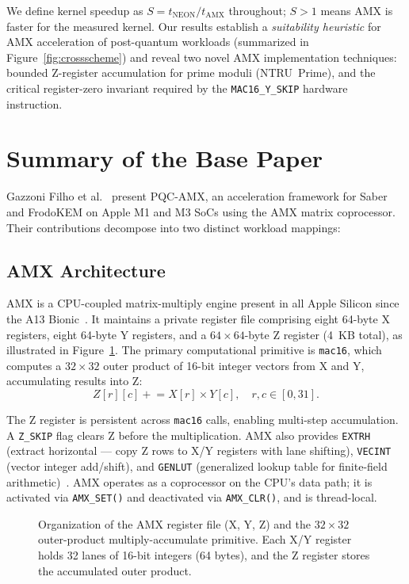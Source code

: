 \documentclass[utf8]{FrontiersinHarvard}
\newcommand{\boxedfigure}[1]{%
  \fcolorbox{BorderGray}{LightBg}{%
    \begin{minipage}{0.94\linewidth}
      \centering
      #1
    \end{minipage}}}
\begin{document}
We define kernel speedup as $S = t_{\text{NEON}} / t_{\text{AMX}}$ throughout; $S > 1$ means AMX is faster for the measured kernel. Our results establish a \emph{suitability heuristic} for AMX acceleration of post-quantum workloads (summarized in Figure~\ref{fig:crossscheme}) and reveal two novel AMX implementation techniques: bounded Z-register accumulation for prime moduli (NTRU~Prime), and the critical register-zero invariant required by the \texttt{MAC16\_Y\_SKIP} hardware instruction.


\section{Summary of the Base Paper}
\label{sec:basepaper}

Gazzoni Filho et al.~\cite{gazzoni2024pqcamx} present PQC-AMX, an acceleration framework for Saber and FrodoKEM on Apple M1 and M3 SoCs using the AMX matrix coprocessor. Their contributions decompose into two distinct workload mappings:

\subsection{AMX Architecture}

AMX is a CPU-coupled matrix-multiply engine present in all Apple Silicon since the A13 Bionic~\cite{dougallj2022amx}. It maintains a private register file comprising eight 64-byte X registers, eight 64-byte Y registers, and a $64\times64$-byte Z register (4~KB total), as illustrated in Figure~\ref{fig:amx-registers}. The primary computational primitive is \texttt{mac16}, which computes a $32\times32$ outer product of 16-bit integer vectors from X and Y, accumulating results into Z:
\[
  Z[r][c] \mathrel{+}= X[r] \times Y[c], \quad r, c \in [0, 31].
\]

The Z register is persistent across \texttt{mac16} calls, enabling multi-step accumulation. A \texttt{Z\_SKIP} flag clears Z before the multiplication. AMX also provides \texttt{EXTRH} (extract horizontal --- copy Z rows to X/Y registers with lane shifting), \texttt{VECINT} (vector integer add/shift), and \texttt{GENLUT} (generalized lookup table for finite-field arithmetic)~\cite{corsix2022amx}. AMX operates as a coprocessor on the CPU's data path; it is activated via \texttt{AMX\_SET()} and deactivated via \texttt{AMX\_CLR()}, and is thread-local.

\begin{figure}[htbp]
  \centering
  \boxedfigure{}
  \caption{Organization of the AMX register file (X, Y, Z) and the $32\times32$ outer-product multiply-accumulate primitive. Each X/Y register holds 32 lanes of 16-bit integers (64 bytes), and the Z register stores the accumulated outer product.}
  \label{fig:amx-registers}
\end{figure}
\end{document}
